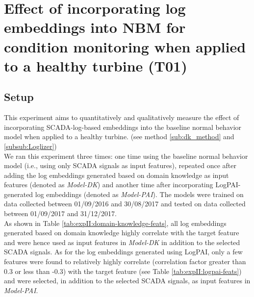 \section{Effect of incorporating log embeddings into NBM for condition monitoring when applied to a healthy turbine (T01)}
\subsection{Setup}
This experiment aims to quantitatively and qualitatively measure 
the effect of incorporating SCADA-log-based embeddings into the baseline normal behavior model when applied to a healthy turbine.
(see method \ref{sub:dk_method} and \ref{subsub:Loglizer})\\
We ran this experiment three times: one time using the baseline normal behavior model (i.e., using only SCADA signals as input features), 
repeated once after adding the log embeddings generated based on domain knowledge as input features (denoted as \emph{Model-DK}) and 
another time after incorporating LogPAI-generated log embeddings (denoted as \emph{Model-PAI}).
The models were trained on data collected between 01/09/2016 and 30/08/2017 and tested on data collected between
01/09/2017 and 31/12/2017.\\
As shown in Table \ref{tab:expII:domain-knowledge-feats}, all log embeddings generated based on domain knowledge highly correlate with the target feature 
and were hence used as input features in \emph{Model-DK} in addition to the selected SCADA signals.
As for the log embeddings generated using LogPAI, only a few features were found to relatively highly correlate (correlation factor greater than 0.3 or less than -0.3) 
with the target feature (see Table \ref{tab:expII:logpai-feats}) and were selected, in addition to the selected SCADA signals, as input features in \emph{Model-PAI}.

